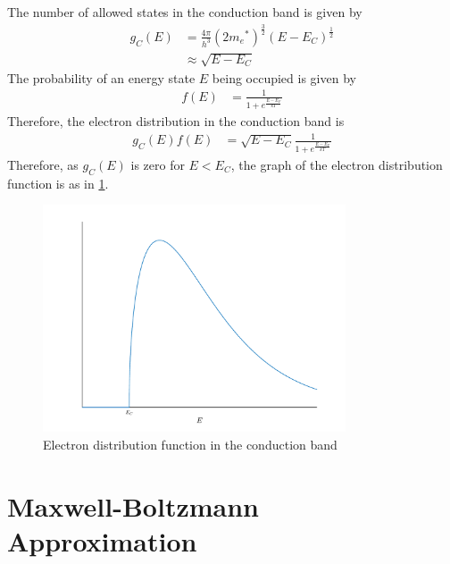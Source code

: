 \documentclass[titlepage, fleqn, a4paper, 12pt, twoside]{article}
\theoremstyle{definition}
\theoremstyle{theorem}
\begin{document}
The number of allowed states in the conduction band is given by
\begin{align*}
	g_C(E) & = \frac{4 \pi}{h^3} \left( 2 {m_e}^* \right)^{\frac{3}{2}} (E - E_C)^{\frac{1}{2}} \\
               & \approx \sqrt{E - E_C}
\end{align*}
The probability of an energy state $E$ being occupied is given by
\begin{align*}
	f(E) & = \frac{1}{1 + e^{\frac{E - E_F}{k T}}}
\end{align*}
Therefore, the electron distribution in the conduction band is
\begin{align*}
	g_C(E) f(E) & = \sqrt{E - E_C} \frac{1}{1 + e^{\frac{E - E_F}{k T}}}
\end{align*}
Therefore, as $g_C(E)$ is zero for $E < E_C$, the graph of the electron distribution function is as in \cref{fig:Electron_distribution_function_in_the_conduction_band}.
\begin{figure}[h]
	\centering
	\includegraphics[width = 0.8\textwidth]{./Plots/electron_distribution_in_conduction_band.pdf}
	\caption{Electron distribution function in the conduction band}
	\label{fig:Electron_distribution_function_in_the_conduction_band}
\end{figure}

\section{Maxwell-Boltzmann Approximation}
\end{document}
